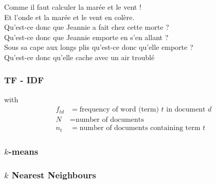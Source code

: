 \begin{frame}[t]
{   Comme il faut calculer la marée et le vent !\\
   Et l'onde et la marée et le vent en colère.\\[5mm]

   Qu'est-ce donc que Jeannie a fait chez cette morte ?\\
   Qu'est-ce donc que Jeannie emporte en s'en allant ?\\[5mm]

   Sous sa cape aux longs plis qu'est-ce donc qu'elle emporte ?\\
   Qu'est-ce donc qu'elle cache avec un air troublé
  }
\end{frame}

\begin{frame}
  \frametitle{TF - IDF}

  with
  \begin{align*}
    f_{td} &= \mbox{frequency of word (term) $t$ in document $d$} \\
    N &= \mbox{number of documents}\\
    n_t &= \mbox{number of documents containing term $t$}
  \end{align*}
\end{frame}

\begin{frame}
  \frametitle{$k$-means}
\end{frame}

\begin{frame}
  \frametitle{$k$ Nearest Neighbours}
\end{frame}

\begin{frame}
  
\end{frame}

